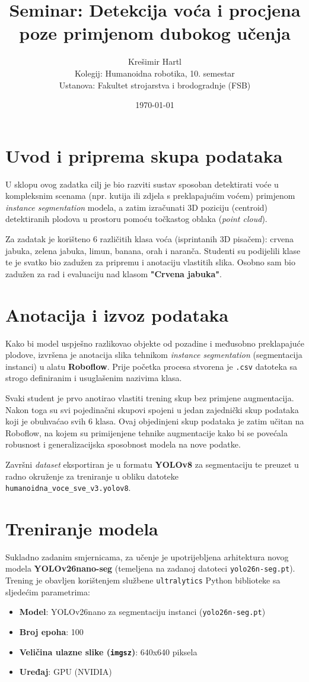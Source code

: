\documentclass[12pt,a4paper]{article}
\title{Seminar: Detekcija voća i procjena poze primjenom dubokog učenja}
\author{Krešimir Hartl \\ Kolegij: Humanoidna robotika, 10. semestar \\ Ustanova: Fakultet strojarstva i brodogradnje (FSB)}
\date{\today}
\begin{document}
\maketitle

\section{Uvod i priprema skupa podataka}
U sklopu ovog zadatka cilj je bio razviti sustav sposoban detektirati voće u kompleksnim scenama (npr. kutija ili zdjela s preklapajućim voćem) primjenom \textit{instance segmentation} modela, a zatim izračunati 3D poziciju (centroid) detektiranih plodova u prostoru pomoću točkastog oblaka (\textit{point cloud}). 

Za zadatak je korišteno 6 različitih klasa voća (isprintanih 3D pisačem): crvena jabuka, zelena jabuka, limun, banana, orah i naranča. Studenti su podijelili klase te je svatko bio zadužen za pripremu i anotaciju vlastitih slika. Osobno sam bio zadužen za rad i evaluaciju nad klasom \textbf{"Crvena jabuka"}.

\section{Anotacija i izvoz podataka}
Kako bi model uspješno razlikovao objekte od pozadine i međusobno preklapajuće plodove, izvršena je anotacija slika tehnikom \textit{instance segmentation} (segmentacija instanci) u alatu \textbf{Roboflow}. Prije početka procesa stvorena je \texttt{.csv} datoteka sa strogo definiranim i usuglašenim nazivima klasa.

Svaki student je prvo anotirao vlastiti trening skup bez primjene augmentacija. Nakon toga su svi pojedinačni skupovi spojeni u jedan zajednički skup podataka koji je obuhvaćao svih 6 klasa. Ovaj objedinjeni skup podataka je zatim učitan na Roboflow, na kojem su primijenjene tehnike augmentacije kako bi se povećala robusnost i generalizacijska sposobnost modela na nove podatke. 

Završni \textit{dataset} eksportiran je u formatu \textbf{YOLOv8} za segmentaciju te preuzet u radno okruženje za treniranje u obliku datoteke \texttt{humanoidna\_voce\_sve\_v3.yolov8}.

\section{Treniranje modela}
Sukladno zadanim smjernicama, za učenje je upotrijebljena arhitektura novog modela \textbf{YOLOv26nano-seg} (temeljena na zadanoj datoteci \texttt{yolo26n-seg.pt}). Trening je obavljen korištenjem službene \texttt{ultralytics} Python biblioteke sa sljedećim parametrima:
\begin{itemize}
    \item \textbf{Model}: YOLOv26nano za segmentaciju instanci (\texttt{yolo26n-seg.pt})
    \item \textbf{Broj epoha}: 100
    \item \textbf{Veličina ulazne slike (\texttt{imgsz})}: 640x640 piksela
    \item \textbf{Uređaj}: GPU (NVIDIA)
\end{itemize}
\end{document}
